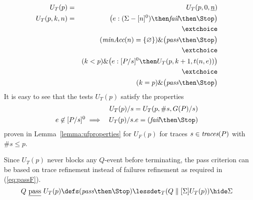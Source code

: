 \begin{eqnarray}
U_T(p) & = & U_T(p,0,\ii n)
\\
U_T(p,k,n) & = & \big(  e:(\Sigma - [n]^0)   \then \efail\then \Stop \big)
\label{eq:uta}
\\ & & \extchoice \nonumber
\\ & & (\minaccs(n) = \{ \varnothing \})   \&   \big( \epass \then \Stop \big)
\label{eq:utb}
\\ & & \extchoice \nonumber
\\ & & (k < p) \& \big( e:[P/s]^0   \then U_T(p,k+1,t(n,e)) \big)
\label{eq:utc}
\\ & & \extchoice \nonumber
\\ & & (k = p) \& \big( \epass\then \Stop  \big)
\label{eq:utd}
\end{eqnarray}
%
It is easy to see that the tests $U_T(p)$ satisfy the properties
\begin{eqnarray}
\label{eq:ifpaT}
  &  & U_T(p)/s = U_T(p,\#s,G(P)/s)
\\
\label{eq:ifpbT}
e\not\in [P/s]^0 & \implies & U_T(p)/s.e = (\efail\then\Stop)
\end{eqnarray}
proven in Lemma~\ref{lemma:ufproperties} for $U_F(p)$ for traces
$s\in\text{\it traces}(P)$ with $\#s \le p$. 


Since
$U_T(p)$ never blocks any $Q$-event before terminating, the pass criterion
can be based on trace refinement instead of failures refinement as required
in (\ref{eq:passF}).
%
\begin{equation}
\label{eq:passT}
Q\ \pass\ U_T(p) \defs (\epass\then\Stop) \lessdet_T (Q\parallel[\Sigma] U_T(p)) \hide \Sigma
\end{equation}

